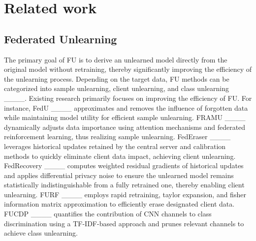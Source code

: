 \section{Related work}
\label{relatedwork}
\subsection{Federated Unlearning}
The primary goal of FU is to derive an unlearned model directly from the original model without retraining, thereby significantly improving the efficiency of the unlearning process. Depending on the target data, FU methods can be categorized into sample unlearning, client unlearning, and class unlearning ____. 
Existing research primarily focuses on improving the efficiency of FU. For instance, FedU ____ approximates and removes the influence of forgotten data while maintaining model utility for efficient sample unlearning. FRAMU ____ dynamically adjusts data importance using attention mechanisms and federated reinforcement learning, thus realizing sample unlearning. FedEraser ____ leverages historical updates retained by the central server and calibration methods to quickly eliminate client data impact, achieving client unlearning. FedRecovery ____ computes weighted residual gradients of historical updates and applies differential privacy noise to ensure the unlearned model remains statistically indistinguishable from a fully retrained one, thereby enabling client unlearning. FURF ____ employs rapid retraining, taylor expansion, and fisher information matrix approximation to efficiently erase designated client data. FUCDP ____ quantifies the contribution of CNN channels to class discrimination using a TF-IDF-based approach and prunes relevant channels to achieve class unlearning.  

